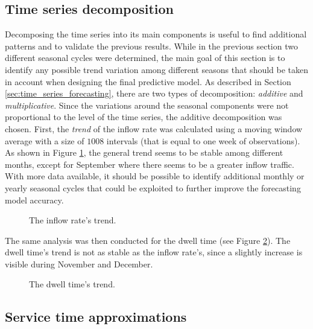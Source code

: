\subsection{Time series decomposition}
\label{subsec:time_series_decomposition}

Decomposing the time series into its main components is useful to find additional patterns and to validate the previous results. While in the previous section two different seasonal cycles were determined, the main goal of this section is to identify any possible trend variation among different seasons that should be taken in account when designing the final predictive model. As described in Section \ref{sec:time_series_forecasting}, there are two types of decomposition: \emph{additive} and \emph{multiplicative}. Since the variations around the seasonal components were not proportional to the level of the time series, the additive decomposition was chosen.
First, the \emph{trend} of the inflow rate was calculated using a moving window average with a size of \( 1008 \) intervals (that is equal to one week of observations). As shown in Figure \ref{fig:inflow_rate_trend}, the general trend seems to be stable among different months, except for September where there seems to be a greater inflow traffic. With more data available, it should be possible to identify additional monthly or yearly seasonal cycles that could be exploited to further improve the forecasting model accuracy.

\begin{figure}
  \begin{center}
  \end{center}
  \caption{The inflow rate's trend.}
  \label{fig:inflow_rate_trend}
\end{figure}

The same analysis was then conducted for the dwell time (see Figure \ref{fig:dwell_time_trend}). The dwell time’s trend is not as stable as the inflow rate’s, since a slightly increase is visible during November and December.

\begin{figure}
  \begin{center}
  \end{center}
  \caption{The dwell time's trend.}
  \label{fig:dwell_time_trend}
\end{figure}

\subsection{Service time approximations}
\label{subsec:service_time_approximations}

